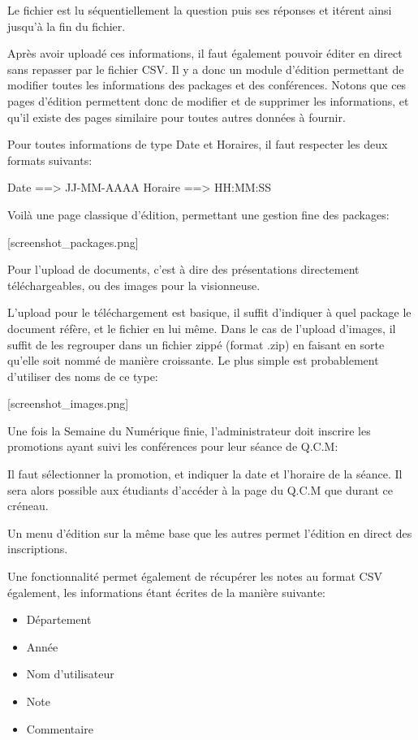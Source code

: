     Le fichier est lu séquentiellement la question puis ses réponses et itérent ainsi jusqu'à la fin du fichier.

    Après avoir uploadé ces informations, il faut également pouvoir éditer en direct sans repasser par le fichier CSV.
    Il y a donc un module d'édition permettant de modifier toutes les informations des packages et des conférences.
    Notons que ces pages d'édition permettent donc de modifier et de supprimer les informations, et qu'il existe des pages
    similaire pour toutes autres données à fournir.

    Pour toutes informations de type Date et Horaires, il faut respecter les deux formats suivants:

    Date ==> JJ-MM-AAAA
    Horaire ==> HH:MM:SS

    Voilà une page classique d'édition, permettant une gestion fine des packages:

    [screenshot_packages.png]

    Pour l'upload de documents, c'est à dire des présentations directement téléchargeables, ou des images pour la visionneuse.

    L'upload pour le téléchargement est basique, il suffit d'indiquer à quel package le document réfère, et le fichier en lui même.
    Dans le cas de l'upload d'images, il suffit de les regrouper dans un fichier zippé (format .zip) en faisant en sorte qu'elle soit
    nommé de manière croissante. Le plus simple est probablement d'utiliser des noms de ce type:

    [screenshot_images.png]

    Une fois la Semaine du Numérique finie, l'administrateur doit inscrire les promotions ayant suivi les conférences pour leur
    séance de Q.C.M:

    Il faut sélectionner la promotion, et indiquer la date et l'horaire de la séance. Il sera alors possible aux étudiants d'accéder
    à la page du Q.C.M que durant ce créneau.

    Un menu d'édition sur la même base que les autres permet l'édition en direct des inscriptions.

    Une fonctionnalité permet également de récupérer les notes au format CSV également, les informations étant écrites de la manière suivante:

    \begin{itemize}
    \item Département
    \item Année
    \item Nom d'utilisateur
    \item Note
    \item Commentaire
    \end{itemize}

